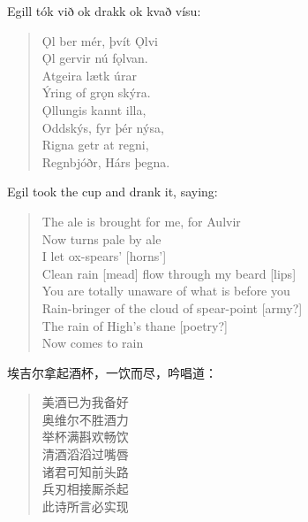 \begin{paracol}{2}
    Egill tók við ok drakk ok kvað vísu:
    \begin{quote}
        Ǫl ber mér, þvít Ǫlvi\\
        Ǫl gervir nú fǫlvan.\\
        Atgeira lætk úrar\\
        Ýring of grǫn skýra.\\
        Ǫllungis kannt illa,\\
        Oddskýs, fyr þér nýsa,\\
        Rigna getr at regni,\\
        Regnbjóðr, Hárs þegna.
    \end{quote}

    \switchcolumn
    Egil took the cup and drank it, saying:
    \begin{quote}
        The ale is brought for me, for Aulvir\\
        Now turns pale by ale\\
        I let ox-spears' [horns']\\
        Clean rain [mead] flow through my beard [lips]\\
        You are totally unaware of what is before you\\
        Rain-bringer of the cloud of spear-point [army?]\\
        The rain of High's thane [poetry?] \\
        Now comes to rain
    \end{quote}
\end{paracol}
\begin{translation*}{}
    埃吉尔拿起酒杯，一饮而尽，吟唱道：
    \begin{quote}
        美酒已为我备好\\
        奥维尔不胜酒力\\
        举杯满斟欢畅饮\\
        清酒滔滔过嘴唇\\
        诸君可知前头路\\
        兵刃相接厮杀起\\
        此诗所言必实现
    \end{quote}

\end{translation*}
